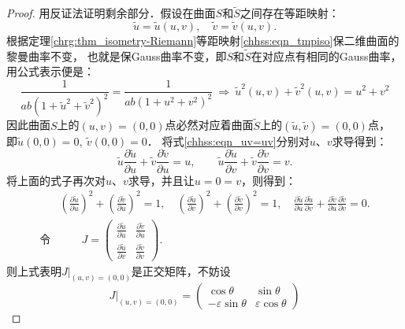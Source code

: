 \begin{proof}
用反证法证明剩余部分．假设在曲面$S$和$\tilde{S}$之间存在等距映射：
\begin{equation}\label{chhss:eqn_tmpiso}
    \tilde{u}=\tilde{u}(u, v), \quad \tilde{v}=\tilde{v}(u, v) .
\end{equation}
根据定理\ref{chrg:thm_isometry-Riemann}等距映射\eqref{chhss:eqn_tmpiso}保二维曲面的黎曼曲率不变，
也就是保Gauss曲率不变，即$S$和$\tilde{S}$在对应点有相同的Gauss曲率，用公式表示便是：
\setlength{\mathindent}{0em}
\begin{equation}\label{chhss:eqn_uv=uv}
    \frac{1}{a b\left(1+\tilde{u}^2+\tilde{v}^2\right)^2} = \frac{1}{a b \left(1+u^2+v^2\right)^2} 
    \ \Rightarrow \  \tilde{u}^2(u, v)+\tilde{v}^2(u, v)=u^2+v^2 
\end{equation}\setlength{\mathindent}{2em}
因此曲面$S$上的$(u, v)=(0,0)$点必然对应着曲面$\tilde{S}$上的$(\tilde{u}, \tilde{v})=(0,0)$点，
即$\tilde{u}(0,0)=0, \ \tilde{v}(0,0)=0 $．
将式\eqref{chhss:eqn_uv=uv}分别对$u$、$v$求导得到：
\begin{equation}
    \tilde{u} \frac{\partial \tilde{u}}{\partial u}+\tilde{v} \frac{\partial \tilde{v}}{\partial u}=u, 
    \qquad \tilde{u} \frac{\partial \tilde{u}}{\partial v}+\tilde{v} \frac{\partial \tilde{v}}{\partial v}=v.
\end{equation}
将上面的式子再次对$u$、$v$求导，并且让$u=0=v$，则得到：
\begin{align*}
    &\left(\frac{\partial \tilde{u}}{\partial u}\right)^2+\left(\frac{\partial \tilde{v}}{\partial u}\right)^2=1, \quad
    \left(\frac{\partial \tilde{u}}{\partial v}\right)^2+\left(\frac{\partial \tilde{v}}{\partial v}\right)^2=1, \quad
    \frac{\partial \tilde{u}}{\partial u} \frac{\partial \tilde{u}}{\partial v}
    +\frac{\partial \tilde{v}}{\partial u} \frac{\partial \tilde{v}}{\partial v}=0 .  \\
  \text{令}&\qquad J=\begin{pmatrix}
    \frac{\partial \tilde{u}}{\partial u} & \frac{\partial \tilde{v}}{\partial u} \\
    \frac{\partial \tilde{u}}{\partial v} & \frac{\partial \tilde{v}}{\partial v}
\end{pmatrix} .
\end{align*}
则上式表明$J|_{(u, v)=(0,0)}$是正交矩阵，不妨设
\begin{equation}\label{chhss:eqn_tmpJ00}
    \left. J\right|_{(u, v)=(0,0)} = \begin{pmatrix}
        \cos \theta & \sin \theta \\ 
        -\varepsilon \sin \theta & \varepsilon \cos \theta

\end{pmatrix}
\end{equation}
\end{proof}
